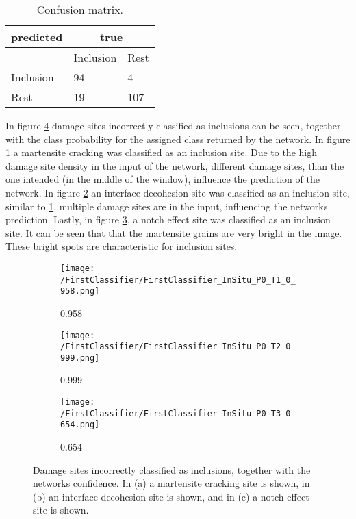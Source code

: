 \begin{table}[H]
 \begin{center}
  \begin{tabular}{@{} *3l @{}} \toprule[2pt]
   predicted &  \multicolumn{2}{c}{true}  \\\midrule
    & Inclusion  & Rest   \\ 
   Inclusion  & 94 & 4 \\ 
   Rest  & 19 & 107 \\ \bottomrule[2pt]
  \end{tabular}
 \end{center}
 \caption{Confusion matrix.}
   \label{tab:FirstClassifierConfusionMatrixInSitu}
\end{table}

In figure \ref{fig:FirstClassifierInSituP0T1} damage sites incorrectly classified as inclusions can be seen, together with the class probability for the assigned class returned by the network. In figure \ref{sub:InSituP0T1} a martensite cracking was classified as an inclusion site. Due to the high damage site density in the input of the network, different damage sites, than the one intended (in the middle of the window), influence the prediction of the network. In figure \ref{sub:InSituP0T2} an interface decohesion site was classified as an inclusion site, similar to \ref{sub:InSituP0T1}, multiple damage sites are in the input, influencing the networks prediction. Lastly, in figure \ref{sub:InSituP0T3}, a notch effect site was classified as an inclusion site. It can be seen that that the martensite grains are very bright in the image. These bright spots are characteristic for inclusion sites.

\begin{figure}[H]
\centering
\begin{subfigure}{.3\textwidth}
\texttt{[image: /FirstClassifier/FirstClassifier\_InSitu\_P0\_T1\_0\_958.png]}
\caption{0.958}
\label{sub:InSituP0T1}
\end{subfigure}
\centering
\begin{subfigure}{.3\textwidth}
\texttt{[image: /FirstClassifier/FirstClassifier\_InSitu\_P0\_T2\_0\_999.png]}
\caption{0.999}
\label{sub:InSituP0T2}
\end{subfigure}
\centering
\begin{subfigure}{.3\textwidth}
\texttt{[image: /FirstClassifier/FirstClassifier\_InSitu\_P0\_T3\_0\_654.png]}
\caption{0.654}
\label{sub:InSituP0T3}
\end{subfigure}
\caption{Damage sites incorrectly classified as inclusions, together with the networks confidence. In (a) a martensite cracking site is shown, in (b) an interface decohesion site is shown, and in (c) a notch effect site is shown.}
\label{fig:FirstClassifierInSituP0T1}
\end{figure}

